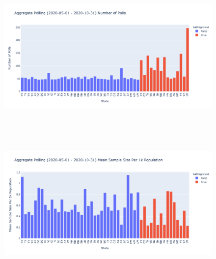 \begin{figure}[H]
    \centering
    \includegraphics[height=20em]{figures/aggregate_polling_2020-05-01_-_2020-10-31_number_of_polls.png}
    \label{fig:aggregate_polling_2020-05-01_-_2020-10-31_number_of_polls}
\end{figure}



\begin{figure}[H]
    \centering
    \includegraphics[height=20em]{figures/aggregate_polling_2020-05-01_-_2020-10-31_mean_sample_size_per_1k_population.png}
    \label{fig:aggregate_polling_2020-05-01_-_2020-10-31_mean_sample_size_per_1k_population}
\end{figure}

